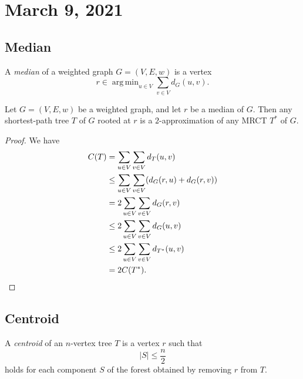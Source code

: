 \documentclass[11pt]{article}
\DeclareMathOperator*{\argmin}{arg \, min}
\begin{document}
\section{March 9, 2021}
\subsection{Median}
A \emph{median} of a weighted graph $G = (V, E, w)$ is a vertex
\begin{equation*}
  r \in \argmin_{u \in V} \sum_{v \in V} d_G(u, v).
\end{equation*}

\begin{theorem}
  Let $G = (V, E, w)$ be a weighted graph, and let $r$ be a median of $G$.
  Then any shortest-path tree $T$ of $G$ rooted at $r$ is a $2$-approximation of any MRCT $T^*$ of $G$.
\end{theorem}
\begin{proof}
  We have
  \begin{align*}
    C(T)
    &= \sum_{u \in V} \sum_{v \in V} d_T(u, v) \\
    &\leq \sum_{u \in V} \sum_{v \in V} (d_G(r, u) + d_G(r, v)) \\
    &= 2 \sum_{u \in V} \sum_{v \in V} d_G(r, v) \\
    &\leq 2 \sum_{u \in V} \sum_{v \in V} d_G(u, v) \\
    &\leq 2 \sum_{u \in V} \sum_{v \in V} d_{T^*}(u, v) \\
    &= 2C(T^*).
    \qedhere
  \end{align*}
\end{proof}

\subsection{Centroid}
A \emph{centroid} of an $n$-vertex tree $T$ is a vertex $r$ such that
\begin{equation*}
  |S| \leq \frac{n}{2}  
\end{equation*}
holds for each component $S$ of the forest obtained by removing $r$ from $T$.
\end{document}
